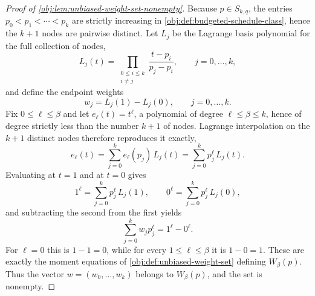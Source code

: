 \begin{proof}[Proof of \cref{obj:lem:unbiased-weight-set-nonempty}]
Because \(p\in S_{k,q}\), the entries \(p_0<p_1<\cdots<p_k\) are strictly increasing in \cref{obj:def:budgeted-schedule-class}, hence the \(k+1\) nodes are pairwise distinct. Let \(L_j\) be the Lagrange basis polynomial for the full collection of nodes,
\[
L_j(t)=\prod_{\substack{0\le i\le k\\ i\ne j}}\frac{t-p_i}{p_j-p_i},
\qquad j=0,\ldots,k,
\]
and define the endpoint weights
\[
w_j=L_j(1)-L_j(0),
\qquad j=0,\ldots,k.
\] %
Fix \(0\le \ell\le\beta\) and let \(e_\ell(t)=t^\ell\), a polynomial of degree \(\ell\le\beta\le k\), hence of degree strictly less than the number \(k+1\) of nodes. Lagrange interpolation on the \(k+1\) distinct nodes therefore reproduces it exactly,
\[
e_\ell(t)=\sum_{j=0}^k e_\ell(p_j)\,L_j(t)
=\sum_{j=0}^k p_j^\ell\,L_j(t).
\]
Evaluating at \(t=1\) and at \(t=0\) gives
\[
1^\ell=\sum_{j=0}^k p_j^\ell\,L_j(1),
\qquad
0^\ell=\sum_{j=0}^k p_j^\ell\,L_j(0),
\]
and subtracting the second from the first yields
\[
\sum_{j=0}^k w_j p_j^\ell
=
1^\ell-0^\ell.
\] %
For \(\ell=0\) this is \(1-1=0\), while for every \(1\le\ell\le\beta\) it is \(1-0=1\). These are exactly the moment equations of \cref{obj:def:unbiased-weight-set} defining \(W_\beta(p)\). Thus the vector \(w=(w_0,\ldots,w_k)\) belongs to \(W_\beta(p)\), and the set is nonempty. %
\end{proof}

